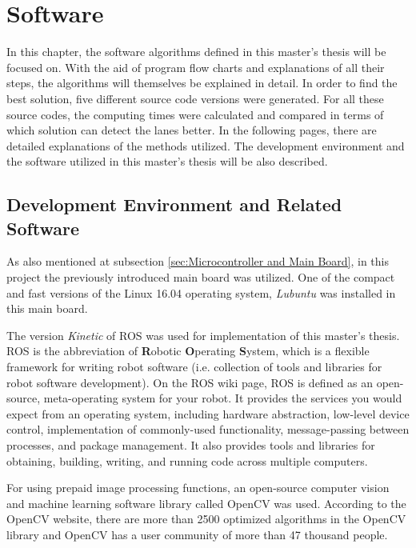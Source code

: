 %
\section{Software}\label{sec:Software}


In this chapter, the software algorithms defined in this master's thesis will be focused on. With the aid of program flow charts and explanations of all their steps, the algorithms will themselves be explained in detail. In order to find the best solution, five different source code versions were generated. For all these source codes, the computing times were calculated and compared in terms of which solution can detect the lanes better. In the following pages, there are detailed explanations of the methods utilized. The development environment and the software utilized in this master's thesis will be also described.

%
\subsection{Development Environment and Related Software}
\label{sec:Development Environment and Related Software}

As also mentioned at subsection \ref{sec:Microcontroller and Main Board}, in this project the previously introduced main board was utilized. One of the compact and fast versions of the Linux 16.04 operating system, \textit{Lubuntu} was installed in this main board.

The version \textit{Kinetic} of ROS was used for implementation of this master's thesis. ROS is the abbreviation of \textbf{R}obotic \textbf{O}perating \textbf{S}ystem, which is a flexible framework for writing robot software (i.e. collection of tools and libraries for robot software development). On the ROS wiki page\cite{ROS}, ROS is defined as an open-source, meta-operating system for your robot. It provides the services you would expect from an operating system, including hardware abstraction, low-level device control, implementation of commonly-used functionality, message-passing between processes, and package management. It also provides tools and libraries for obtaining, building, writing, and running code across multiple computers.

For using prepaid image processing functions, an open-source computer vision and machine learning software library called OpenCV was used. According to the OpenCV website\cite{OpenCV_About}, there are more than 2500 optimized algorithms in the OpenCV library and OpenCV has a user community of more than 47 thousand people.

